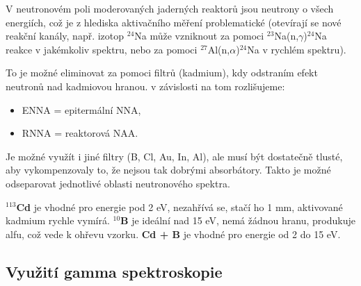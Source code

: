 V neutronovém poli moderovaných jaderných reaktorů jsou neutrony o všech energiích, což je z hlediska aktivačního měření problematické (otevírají se nové reakční kanály, např. izotop $^{24}$Na může vzniknout za pomoci $^{23}$Na(n,$\gamma$)$^{24}$Na reakce v jakémkoliv spektru, nebo za pomoci $^{27}$Al(n,$\alpha$)$^{24}$Na v rychlém spektru). 

To je možné eliminovat za pomoci filtrů (kadmium), kdy odstraním efekt neutronů nad kadmiovou hranou. v závislosti na tom rozlišujeme:

\begin{itemize}
    \item ENNA = epitermální NNA,
    \item RNNA = reaktorová NAA.
\end{itemize}

Je možné využít i jiné filtry (B, Cl, Au, In, Al), ale musí být dostatečně tlusté, aby vykompenzovaly to, že nejsou tak dobrými absorbátory. Takto je možné odseparovat jednotlivé oblasti neutronového spektra.

\textbf{$^{113}$Cd} je vhodné pro energie pod 2 eV, nezahřívá se, stačí ho 1 mm, aktivované kadmium rychle vymírá. \textbf{$^{10}$B} je ideální nad 15 eV, nemá žádnou hranu, produkuje alfu, což vede k ohřevu vzorku. \textbf{Cd + B} je vhodné pro energie od 2 do 15 eV. 

\subsection{Využití gamma spektroskopie}